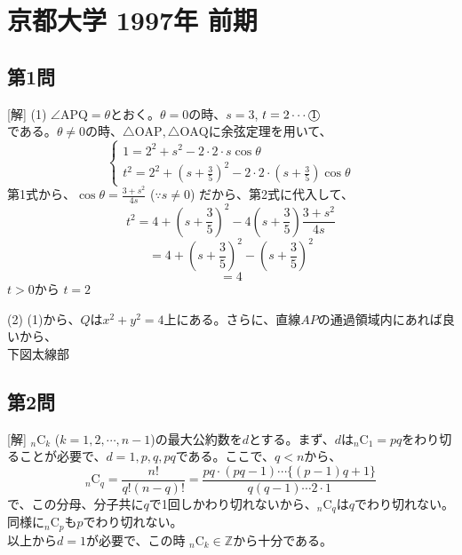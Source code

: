 \documentclass[../main.tex]{subfiles}
\begin{document}
\section*{京都大学 1997年 前期}

\subsection*{第1問}
[解] (1) $\angle \mathrm{APQ} = \theta$とおく。$\theta = 0$の時、$s=3$, $t=2 \cdots \text{\textcircled{1}}$\\
である。$\theta \neq 0$の時、$\triangle \mathrm{OAP}, \triangle \mathrm{OAQ}$に余弦定理を用いて、
$$
\begin{cases}
  1 = 2^2 + s^2 - 2 \cdot 2 \cdot s \cos\theta \\
  t^2 = 2^2 + \left(s + \frac{3}{5}\right)^2 - 2 \cdot 2 \cdot \left(s + \frac{3}{5}\right) \cos\theta
\end{cases}
$$
第1式から、$\cos\theta = \frac{3+s^2}{4s}$ ($\because s \neq 0$) だから、第2式に代入して、
$$
t^2 = 4 + \left(s + \frac{3}{5}\right)^2 - 4 \left(s + \frac{3}{5}\right) \frac{3+s^2}{4s}
$$
$$
= 4 + \left(s + \frac{3}{5}\right)^2 - \left(s + \frac{3}{5}\right)^2
$$
$$
= 4
$$
$t > 0$から $t = 2$

(2) (1)から、$Q$は$x^2+y^2=4$上にある。さらに、直線$AP$の通過領域内にあれば良いから、\\
下図太線部
\begin{center}
\end{center}

\subsection*{第2問}
[解] ${}_n \mathrm{C}_k$ ($k=1,2,\cdots, n-1$)の最大公約数を$d$とする。まず、$d$は${}_n \mathrm{C}_1 = pq$をわり切ることが必要で、$d=1,p,q,pq$である。ここで、$q < n$から、
$$
{}_n \mathrm{C}_q = \frac{n!}{q!(n-q)!} = \frac{pq \cdot (pq-1) \cdots \{ (p-1)q + 1 \}}{q (q-1) \cdots 2 \cdot 1}
$$
で、この分母、分子共に$q$で1回しかわり切れないから、${}_n \mathrm{C}_q$は$q$でわり切れない。同様に${}_n \mathrm{C}_p$も$p$でわり切れない。\\
以上から$d=1$が必要で、この時 ${}_n \mathrm{C}_k \in \mathbb{Z}$から十分である。
\end{document}
